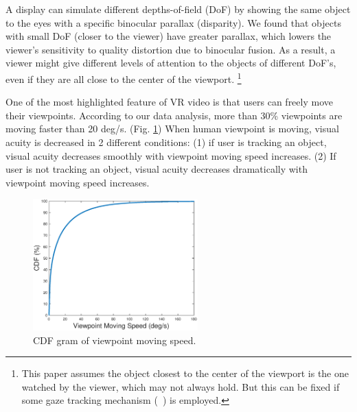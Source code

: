  
A \vr display can simulate different depths-of-field (DoF) by showing the same object to the eyes with a specific binocular parallax (disparity). 
We found that objects with small DoF (\ie closer to the viewer) have greater parallax, which lowers the viewer's sensitivity to quality distortion due to binocular fusion.
As a result, a viewer might give different levels of attention to the objects of different DoF's, even if they are all close to the center of the viewport. \footnote{This paper assumes the object closest to the center of the viewport is the one watched by the viewer, which may not always hold. But this can be fixed if some gaze tracking mechanism (\eg~\cite{??,??}) is employed.}






One of the most highlighted feature of VR video is that users can freely move their viewpoints. According to our data analysis, more than 30\% viewpoints are moving faster than 20 deg/s. (Fig. \ref{CDFspeed}) 
When human viewpoint is moving, visual acuity is decreased in 2 different conditions: (1) if user is tracking an object, visual acuity decreases smoothly with viewpoint moving speed increases. (2) If user is not tracking an object, visual acuity decreases dramatically with viewpoint moving speed increases. \cite{speed}

\begin{figure}
  \centering
  \includegraphics[width=2.5in]{images/speed_CDF.eps}
  \caption{CDF gram of viewpoint moving speed.}
  \label{CDFspeed}
  \end{figure}




